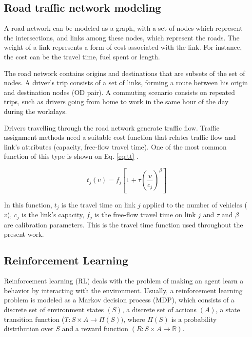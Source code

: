 \documentclass{RITA}
\newcommand{\travTime}{\ensuremath{t_j}} 	%
\newcommand{\fftt}{\ensuremath{f_j}} 		%
\newcommand{\linkCap}{\ensuremath{c_j}}		%
\newcommand{\veh}{\ensuremath{v}}		%
\begin{document}
\subsection{Road traffic network modeling}

A road network can be modeled as a graph, with a set of nodes which represent the intersections, and links among these nodes, which represent the roads. The weight of a link represents a form of cost associated with the link. For instance, the cost can be the travel time, fuel spent or length. 

The road network contains origins and destinations that are subsets of the set of nodes. A driver's trip consists of a set of links, forming a route between his origin and destination nodes (OD pair). A commuting scenario consists on repeated trips, such as drivers going from home to work in the same hour of the day during the workdays.

Drivers travelling through the road network generate traffic flow. Traffic assignment methods need a suitable cost function that relates traffic flow and link's attributes (capacity, free-flow travel time). %
One of the most common function of this type is shown on Eq. \eqref{eq:tt} \cite{Ortuzar&Willumsen2001}.

\begin{equation}
\label{eq:tt}
\travTime(\veh) = \fftt[1 + \tau \left(\frac{\veh}{\linkCap}\right)^\beta]
\end{equation}

In this function, $\travTime$ is the travel time on link $j$ applied to the number of vehicles ($\veh$), $\linkCap$ is the link's capacity, $\fftt$ is the free-flow travel time on link $j$ and $\tau$ and $\beta$ are calibration parameters. This is the travel time function used throughout the present work.

\subsection{Reinforcement Learning}
\label{sec:rl}
Reinforcement learning (RL) deals with the problem of making an agent learn a behavior by interacting with the environment. Usually, a reinforcement learning problem is modeled as a Markov decision process (MDP), which consists of a discrete set of environment states $(S)$, a discrete set of actions $(A)$, a state transition function ($T: S \times A \to \Pi(S))$, where $\Pi(S)$ is a probability distribution over $S$ and a reward function $(R: S \times A \to \mathbb{R})$. %
\end{document}
